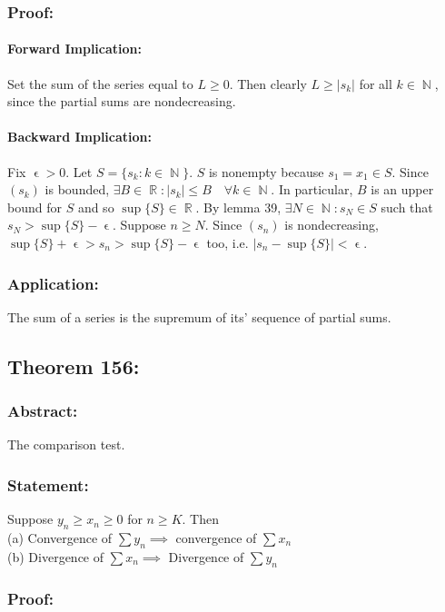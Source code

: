 \documentclass{article}
\DeclareMathOperator\eps{\epsilon}
\DeclareMathOperator\R{\mathbb{R}}
\DeclareMathOperator\N{\mathbb{N}}
\begin{document}
\subsubsection*{Proof:}
\paragraph{Forward Implication: }
Set the sum of the series equal to $L \geq 0$. Then clearly
$L \geq |s_k|$ for all $k \in \N$, since the partial sums are nondecreasing.
\paragraph{Backward Implication: } Fix $\eps>0$. Let $S = \{s_k:k \in \N \}$.
$S$ is nonempty because $s_1 = x_1 \in S$. Since $(s_k)$ is bounded, $\exists B \in \R:
|s_k| \leq B \quad \forall k \in \N$. In particular, $B$ is an upper bound for $S$ and
so $\sup \{ S\} \in \R$. By lemma 39, $\exists N \in \N: s_N \in S $
such that $s_N > \sup \{ S \} - \eps$.
Suppose $n \geq N$. Since $(s_n)$ is nondecreasing, $\sup \{ S \} + \eps>s_n > \sup \{ S \} - \eps$
too, i.e. $|s_n - \sup \{ S \}| < \eps$.


\subsubsection*{Application:}
The sum of a series is the supremum of its' sequence of partial sums.

\subsection{Theorem 156:}
\subsubsection*{Abstract:}
The comparison test.
\subsubsection*{Statement:}
Suppose $y_n \geq x_n \geq 0$ for $n \geq K$. Then \\
\newline
(a) Convergence of $\sum y_n \implies $ convergence of $\sum x_n$ \\
\newline
(b) Divergence of $\sum x_n \implies $ Divergence of $\sum y_n$
\subsubsection*{Proof:}
\end{document}
